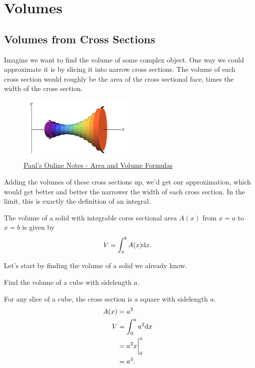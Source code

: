 \section{Volumes}
\subsection{Volumes from Cross Sections}
Imagine we want to find the volume of some complex object.
One way we could approximate it is by slicing it into narrow cross sections.
The volume of each cross section would roughly be the area of the cross sectional face, times the width of the cross section.

\begin{figure}[H]
	\label{volumes}
	\centering
	\includegraphics[width=0.5\textwidth]{./applications_integrals/volumes.png}
	\caption{\hyperref{https://tutorial.math.lamar.edu/classes/calci/Area\_Volume\_Formulas.aspx}{}{}{Paul's Online Notes - Area and Volume Formulas}}
\end{figure}

Adding the volumes of these cross sections up, we'd get our approximation, which would get better and better the narrower the width of each cross section.
In the limit, this is exactly the definition of an integral.

\begin{definition}
	The volume of a solid with integrable corss sectional area $A(x)$ from $x=a$ to $x=b$ is given by
	\begin{equation*}
		V = \int_{a}^{b}{A(x)\mathrm{d} x}.
	\end{equation*}
\end{definition}


Let's start by finding the volume of a solid we already know.
\begin{example}
	Find the volume of a cube with sidelength $a$.
\end{example}
\begin{answer}
	For any slice of a cube, the cross section is a square with sidelength $a$.
	\begin{align*}
		A(x) &= a^2 \\
		V &= \int_{0}^{a}{a^2\mathrm{d} x} \\
		&= a^2x\biggr\rvert_0^a \\
		&= a^3.
	\end{align*}
\end{answer}


